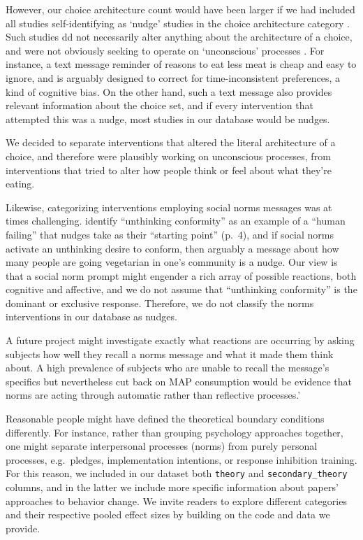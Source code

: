 \documentclass[sn-nature,referee,pdflatex]{sn-jnl}
\begin{document}
However, our choice architecture count would have been larger if we had
included all studies self-identifying as `nudge' studies in the choice
architecture category \citep{thaler2009}. Such studies dd not
necessarily alter anything about the architecture of a choice, and were
not obviously seeking to operate on `unconscious' processes
\citep{garnett2020}. For instance, a text message reminder of reasons to
eat less meat is cheap and easy to ignore, and is arguably designed to
correct for time-inconsistent preferences, a kind of cognitive bias. On
the other hand, such a text message also provides relevant information
about the choice set, and if every intervention that attempted this was
a nudge, most studies in our database would be nudges.

We decided to separate interventions that altered the literal
architecture of a choice, and therefore were plausibly working on
unconscious processes, from interventions that tried to alter how people
think or feel about what they're eating.

Likewise, categorizing interventions employing social norms messages was
at times challenging. \citep{mols2015} identify ``unthinking
conformity'' as an example of a ``human failing'' that nudges take as
their ``starting point'' (p.~4), and if social norms activate an
unthinking desire to conform, then arguably a message about how many
people are going vegetarian in one's community is a nudge. Our view is
that a social norm prompt might engender a rich array of possible
reactions, both cognitive and affective, and we do not assume that
``unthinking conformity'' is the dominant or exclusive response.
Therefore, we do not classify the norms interventions in our database as
nudges.

A future project might investigate exactly what reactions are occurring
by asking subjects how well they recall a norms message and what it made
them think about. A high prevalence of subjects who are unable to recall
the message's specifics but nevertheless cut back on MAP consumption
would be evidence that norms are acting through automatic rather than
reflective processes.'

Reasonable people might have defined the theoretical boundary conditions
differently. For instance, rather than grouping psychology approaches
together, one might separate interpersonal processes (norms) from purely
personal processes, e.g.~pledges, implementation intentions, or response
inhibition training. For this reason, we included in our dataset both
\texttt{theory} and \texttt{secondary\_theory} columns, and in the
latter we include more specific information about papers' approaches to
behavior change. We invite readers to explore different categories and
their respective pooled effect sizes by building on the code and data we
provide.
\end{document}
